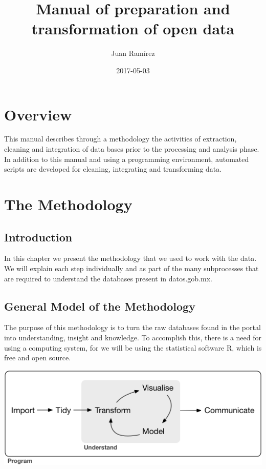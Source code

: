 \documentclass[]{book}
\title{Manual of preparation and transformation of open data}
\author{Juan Ramírez}
\date{2017-05-03}
\begin{document}
\maketitle

{
\setcounter{tocdepth}{1}
\tableofcontents
}
\chapter{Overview}\label{overview}

This manual describes through a methodology the activities of
extraction, cleaning and integration of data bases prior to the
processing and analysis phase. In addition to this manual and using a
programming environment, automated scripts are developed for cleaning,
integrating and transforming data.

\chapter{The Methodology}\label{methodology}

\section{Introduction}\label{introduction}

In this chapter we present the methodology that we used to work with the
data. We will explain each step individually and as part of the many
subprocesses that are required to understand the databases present in
datos.gob.mx.

\section{General Model of the
Methodology}\label{general-model-of-the-methodology}

The purpose of this methodology is to turn the raw databases found in
the portal into understanding, insight and knowledge. To accomplish
this, there is a need for using a computing system, for we will be using
the statistical software R, which is free and open source.

\includegraphics{diagrams/data-science.png}
\end{document}
